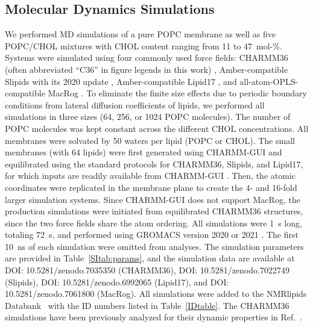\documentclass[journal=jctcce]{achemso}
\begin{document}
\subsection{Molecular Dynamics Simulations}

We performed MD simulations of a pure POPC membrane as well as five POPC/CHOL mixtures with CHOL content ranging from 11 to 47~mol-\%. Systems were simulated using four commonly used force fields: CHARMM36 (often abbreviated ``C36'' in figure legends in this work) \cite{Klauda06,lim12}, Amber-compatible Slipids \cite{jambeck12,jambeck12b,jambeck13b} with its 2020 update \cite{grote2020optimization}, Amber-compatible Lipid17 \cite{dickson14,madej15}, and all-atom-OPLS-compatible MacRog \cite{kulig14,kulig15,Kulig16}. To eliminate the finite size effects due to periodic boundary conditions from lateral diffusion coefficients of lipids, we performed all simulations in three sizes (64, 256, or 1024 POPC molecules). The number of POPC molecules was kept constant across the different CHOL concentrations. All membranes were solvated by 50 waters per lipid (POPC or CHOL). The small membranes (with 64 lipids) were first generated using CHARMM-GUI and equilibrated using the standard protocols for CHARMM36, Slipids, and Lipid17, for which inputs are readily available from CHARMM-GUI \cite{lee16,lee2020charmm}. Then, the atomic coordinates were replicated in the membrane plane to create the 4- and 16-fold larger simulation systems. Since CHARMM-GUI does not support MacRog, the production simulations were initiated from equilibrated CHARMM36 structures, since the two force fields share the atom ordering. All simulations were 1~\textmu{}s long, totaling 72~\textmu{}s, and performed using GROMACS version 2020 or 2021 \cite{pall2020heterogeneous}. The first 10~ns of each simulation were omitted from analyses. The simulation parameters are provided in Table~\ref{SItab:params}, and the simulation data are available at DOI: 10.5281/zenodo.7035350 (CHARMM36), DOI: 10.5281/zenodo.7022749  (Slipids), DOI: 10.5281/zenodo.6992065 (Lipid17), and DOI: 10.5281/zenodo.7061800 (MacRog). All simulations were added to the NMRlipids Databank~\cite{NMRlipidsDatabank} with the ID numbers listed in Table~\ref{IDtable}. The CHARMM36 simulations have been previously analyzed for their dynamic properties in Ref.~.
\end{document}
